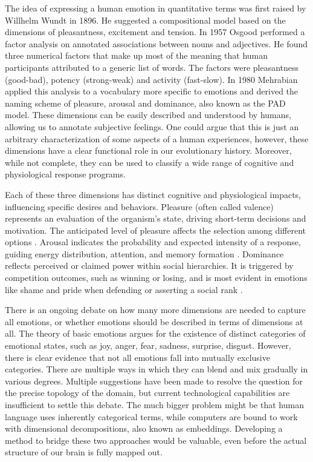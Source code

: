 The idea of expressing a human emotion in quantitative terms was first raised by Willhelm Wundt in 1896.
He suggested a compositional model based on the dimensions of pleasantness, excitement and tension\cite{wundt,tridimensional}.
In 1957 Osgood performed a factor analysis on annotated associations between nouns and adjectives\cite{potency_osgood}.
He found three numerical factors that make up most of the meaning that human participants attributed to a generic list of words.
The factors were pleasantness (good-bad), potency (strong-weak) and activity (fast-slow). In 1980 Mehrabian applied this
analysis to a vocabulary more specific to emotions and derived the naming scheme of pleasure, arousal and dominance, also
known as the PAD model\cite{dominance_mehrabian}. These dimensions can be easily described and understood by humans,
allowing us to annotate subjective feelings. One could argue that this is just an arbitrary characterization of some
aspects of a human experiences, however, these dimensions have a clear functional role in our evolutionary history.
Moreover, while not complete, they can be used to classify a wide range of cognitive and physiological response programs.

Each of these three dimensions has distinct cognitive and physiological impacts, influencing specific desires and behaviors.
Pleasure (often called valence) represents an evaluation of the organism's state, driving short-term decisions and motivation.
The anticipated level of pleasure affects the selection among different options \cite{CABANAC1992173}.
Arousal indicates the probability and expected intensity of a response, guiding energy distribution, attention, and memory
formation \cite{storbeck2008}.
Dominance reflects perceived or claimed power within social hierarchies. It is triggered by competition outcomes, such as winning
or losing, and is most evident in emotions like shame and pride when defending or asserting a social rank \cite{weisfeld2012}.

There is an ongoing debate on how many more dimensions are needed to capture all emotions, or whether emotions should be
described in terms of dimensions at all. The theory of basic emotions argues for the existence of distinct categories
of emotional states, such as joy, anger, fear, sadness, surprise, disgust\cite{Ekman72,ortony1990}. However, there
is clear evidence that not all emotions fall into mutually exclusive categories. There are multiple ways in which they
can blend and mix gradually in various degrees. Multiple suggestions have been made to resolve the question for the precise
topology of the domain\cite{Scherer2007,study5,ZHOU202038}, but current technological capabilities are insufficient to
settle this debate. The much bigger problem might be that human language uses inherently categorical terms,
while computers are bound to work with dimensional decompositions, also known as embeddings. Developing a method to
bridge these two approaches would be valuable, even before the actual structure of our brain is fully mapped out.


